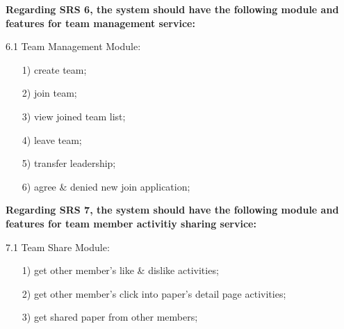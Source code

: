 \documentclass[sigconf, nonacm]{../tex_template/acmart}
\begin{document}
\textbf{Regarding SRS 6, the system should have the following module and features for team management service:}

6.1 Team Management Module:
\begin{itemize}
	\item [1)]
	      create team;
	\item [2)]
	      join team;
	\item [3)]
	      view joined team list;
	\item [4)]
	      leave team;
	\item [5)]
	      transfer leadership;
	\item [6)]
	      agree \& denied new join application;
\end{itemize}

\textbf{Regarding SRS 7, the system should have the following module and features for team member activitiy sharing service:}

7.1 Team Share Module:
\begin{itemize}
	\item [1)]
	      get other member's like \& dislike activities;
	\item [2)]
	      get other member's click into paper's detail page activities;
	\item [3)]
	      get shared paper from other members;

\end{itemize}



% 
\end{document}
